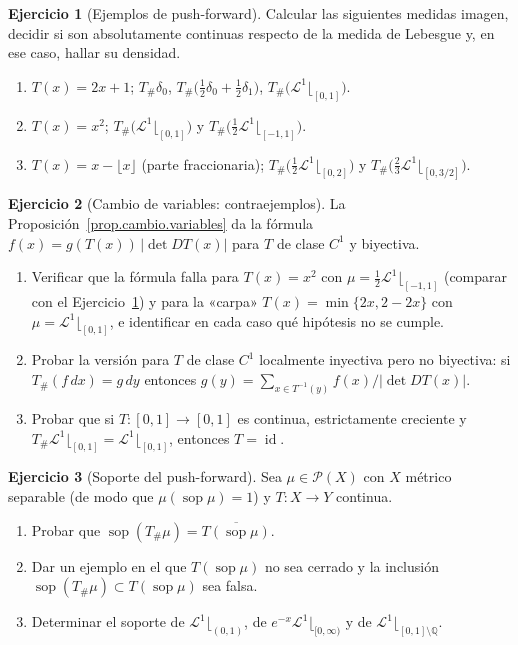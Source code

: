 \documentclass[12pt, a4paper]{amsbook}
\newcommand{\id}{\operatorname{id}}
\def\sop{\operatorname {\mathrm{sop}}}
\newcommand{\Q}{{\mathbb Q}}
\newcommand{\LL}{{\mathcal L}}
\theoremstyle{remark}
\theoremstyle{definition}
\newtheorem{ejercicio}{Ejercicio}[chapter]
\numberwithin{section}{chapter}
\numberwithin{subsection}{section}
\numberwithin{equation}{section}
\numberwithin{figure}{chapter}
\begin{document}
\begin{ejercicio}[Ejemplos de push-forward]\label{ejer.pushforward.ejemplos}
Calcular las siguientes medidas imagen, decidir si son absolutamente
continuas respecto de la medida de Lebesgue y, en ese caso, hallar su densidad.
\begin{enumerate}[label=(\alph*)]
\item $T(x)=2x+1$; $T_\#\delta_0$, $T_\#\bigl(\tfrac12\delta_0+\tfrac12\delta_1\bigr)$,
$T_\#\bigl(\LL^1\lfloor_{[0,1]}\bigr)$.
\item $T(x)=x^2$; $T_\#\bigl(\LL^1\lfloor_{[0,1]}\bigr)$ y
$T_\#\bigl(\tfrac12\LL^1\lfloor_{[-1,1]}\bigr)$.
\item $T(x)=x-\lfloor x\rfloor$ (parte fraccionaria); $T_\#\bigl(\tfrac12\LL^1\lfloor_{[0,2]}\bigr)$
y $T_\#\bigl(\tfrac23\LL^1\lfloor_{[0,3/2]}\bigr)$.
\end{enumerate}
\end{ejercicio}

\begin{ejercicio}[Cambio de variables: contraejemplos]\label{ejer.cambio.variables}
La Proposición~\ref{prop.cambio.variables} da la fórmula
$f(x)=g(T(x))\,|\det DT(x)|$ para $T$ de clase $C^1$ y biyectiva.
\begin{enumerate}[label=(\alph*)]
\item Verificar que la fórmula falla para $T(x)=x^2$ con
$\mu=\frac12\LL^1\lfloor_{[-1,1]}$ (comparar con el
Ejercicio~\ref{ejer.pushforward.ejemplos}) y para la «carpa»
$T(x)=\min\{2x,2-2x\}$ con $\mu=\LL^1\lfloor_{[0,1]}$, e identificar en cada
caso qué hipótesis no se cumple.
\item Probar la versión para $T$ de clase $C^1$ localmente inyectiva pero
no biyectiva: si $T_\#(f\,dx)=g\,dy$ entonces
$g(y)=\sum_{x\in T^{-1}(y)}f(x)/|\det DT(x)|$.
\item Probar que si $T\colon[0,1]\to[0,1]$ es continua, estrictamente
creciente y $T_\#\LL^1\lfloor_{[0,1]}=\LL^1\lfloor_{[0,1]}$, entonces $T=\id$.
\end{enumerate}
\end{ejercicio}

\begin{ejercicio}[Soporte del push-forward]\label{ejer.soporte.pushforward}
Sea $\mu\in\mathcal P(X)$ con $X$ métrico separable (de modo que
$\mu(\sop\mu)=1$) y $T\colon X\to Y$ continua.
\begin{enumerate}[label=(\alph*)]
\item Probar que $\sop(T_\#\mu)=\overline{T(\sop\mu)}$.
\item Dar un ejemplo en el que $T(\sop\mu)$ no sea cerrado y la inclusión
$\sop(T_\#\mu)\subset T(\sop\mu)$ sea falsa.
\item Determinar el soporte de $\LL^1\lfloor_{(0,1)}$, de
$e^{-x}\LL^1\lfloor_{[0,\infty)}$ y de $\LL^1\lfloor_{[0,1]\setminus\Q}$.
\end{enumerate}
\end{ejercicio}
\end{document}
